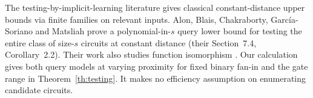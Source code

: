 The testing-by-implicit-learning literature gives classical constant-distance upper bounds via finite families on relevant inputs. Alon, Blais, Chakraborty, Garc\'ia-Soriano and Matsliah prove a polynomial-in-$s$ query lower bound for testing the entire class of size-$s$ circuits at constant distance (their Section~7.4, Corollary~2.2). Their work also studies function isomorphism \cite{iso,extractors}. Our calculation gives both query models at varying proximity for fixed binary fan-in and the gate range in Theorem~\ref{th:testing}. It makes no efficiency assumption on enumerating candidate circuits.
